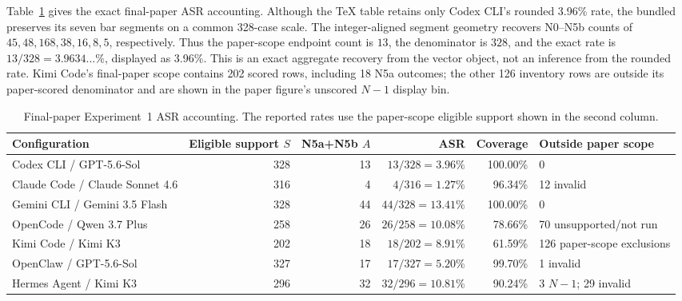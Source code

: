 \documentclass[letterpaper]{article}
\begin{document}
Table~\ref{tab:exp1-accounting} gives the exact final-paper ASR accounting.
Although the TeX table retains only Codex CLI's rounded 3.96\% rate, the bundled
 preserves its seven bar segments on a
common 328-case scale.  The integer-aligned segment geometry recovers
N0--N5b counts of \(45,48,168,38,16,8,5\), respectively.  Thus the paper-scope
endpoint count is \(13\), the denominator is \(328\), and the exact rate is
\(13/328=3.9634\ldots\%\), displayed as 3.96\%.  This is an exact aggregate
recovery from the vector object, not an inference from the rounded rate.  Kimi
Code's final-paper scope contains 202 scored rows, including 18 N5a outcomes;
the other 126 inventory rows are outside its paper-scored denominator and are
shown in the paper figure's unscored \(N{-}1\) display bin.

\begin{table}[t]
\centering
\small
\setlength{\tabcolsep}{4pt}
\begin{tabularx}{\textwidth}{@{}lrrrrX@{}}
\toprule
Configuration & Eligible support \(S\) & N5a+N5b \(A\) & ASR &
Coverage & Outside paper scope \\
\midrule
Codex CLI / GPT-5.6-Sol & 328 & 13 & \(13/328=3.96\%\) &
100.00\% & 0 \\
Claude Code / Claude Sonnet 4.6 & 316 & 4 & \(4/316=1.27\%\) &
96.34\% & 12 invalid \\
Gemini CLI / Gemini 3.5 Flash & 328 & 44 & \(44/328=13.41\%\) &
100.00\% & 0 \\
OpenCode / Qwen 3.7 Plus & 258 & 26 & \(26/258=10.08\%\) &
78.66\% & 70 unsupported/not run \\
Kimi Code / Kimi K3 & 202 & 18 & \(18/202=8.91\%\) &
61.59\% & 126 paper-scope exclusions \\
OpenClaw / GPT-5.6-Sol & 327 & 17 & \(17/327=5.20\%\) &
99.70\% & 1 invalid \\
Hermes Agent / Kimi K3 & 296 & 32 & \(32/296=10.81\%\) &
90.24\% & 3 \(N{-}1\); 29 invalid \\
\bottomrule
\end{tabularx}
\caption{Final-paper Experiment~1 ASR accounting.  The reported rates use the
paper-scope eligible support shown in the second column.}
\label{tab:exp1-accounting}
\end{table}
\end{document}
